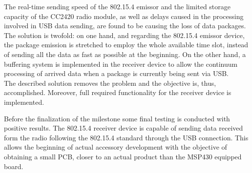 \begin{enumerate}
			The real-time sending speed of the 802.15.4 emissor and the limited storage capacity of the CC2420 radio module, as well as delays caused in the processing involved in USB data sending, are found to be causing the loss of data packages. The solution is twofold: on one hand, and regarding the 802.15.4 emissor device, the package emission is stretched to employ the whole available time slot, instead of sending all the data as fast as possible at the beginning. On the other hand, a buffering system is implemented in the receiver device to allow the continuum processing of arrived data when a package is currently being sent via USB.\\

			The described solution removes the problem and the objective is, thus, accomplished. Moreover, full required functionality for the receiver device is implemented.\\

			\end{enumerate}
	
		Before the finalization of the milestone some final testing is conducted with positive results. The 802.15.4 receiver device is capable of sending data received form the radio following the 802.15.4 standard through the USB connection. This allows the beginning of actual accessory development with the objective of obtaining a small PCB, closer to an actual product than the MSP430 equipped board.\\

